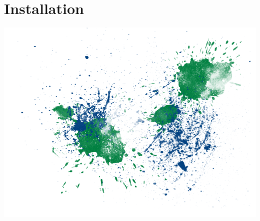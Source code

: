 \documentclass[11pt,twoside]{article}
\begin{document}



%
%

\newpage
\part{Installation}
\label{part:installation}


\bigskip

\vfill

\includegraphics[width=\textwidth]{graphics/liquid_splatter_04.png}

\vfill





%
%



\appendix
%
%
\end{document}
